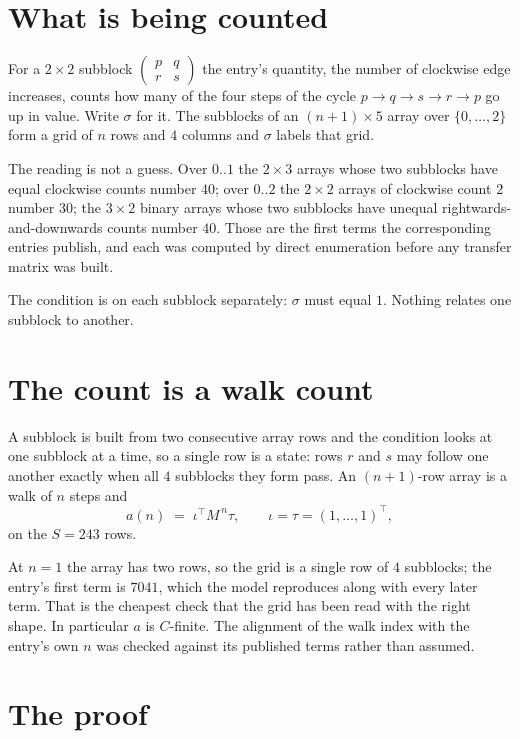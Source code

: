 \documentclass[11pt,a4paper]{article}
\theoremstyle{plain}
\theoremstyle{definition}
\begin{document}
\section{What is being counted}

For a $2\times2$ subblock $\begin{pmatrix}p&q\\r&s\end{pmatrix}$ the
entry's quantity, the number of clockwise edge increases, counts how many of the four steps of the cycle $p\to q\to s\to r\to p$ go up in value. Write $\sigma$ for it. The subblocks of an
$(n+1)\times5$ array over $\{0,\dots,2\}$ form a grid of $n$ rows and $4$
columns and $\sigma$ labels that grid.

The reading is not a guess. Over $0..1$ the $2\times3$ arrays whose two subblocks have equal
clockwise counts number $40$; over $0..2$ the $2\times2$ arrays of clockwise count $2$ number
$30$; the $3\times2$ binary arrays whose two subblocks have unequal rightwards-and-downwards
counts number $40$. Those are the first terms the corresponding entries publish, and each was
computed by direct enumeration before any transfer matrix was built.

The condition is on each subblock separately: $\sigma$ must equal $1$. Nothing
relates one subblock to another.

\section{The count is a walk count}

A subblock is built from two consecutive array rows and the condition looks
at one subblock at a time, so a single row is a state: rows $r$ and $s$ may follow one another
exactly when all $4$ subblocks they form pass. An $(n+1)$-row array is a walk of $n$ steps and
\[
a(n)\;=\;\iota^{\!\top}M^{\,n}\tau,\qquad\iota=\tau=(1,\dots,1)^{\!\top},
\]
on the $S=243$ rows.

At $n=1$ the array has two rows, so the grid is a single row of $4$
subblocks; the entry's first term is $7041$, which the model
reproduces along with every later term. That is the cheapest check that the grid has been read
with the right shape.
In particular $a$ is $C$-finite. The alignment of the walk index with the entry's own $n$ was
checked against its published terms rather than assumed.

\section{The proof}
\end{document}
